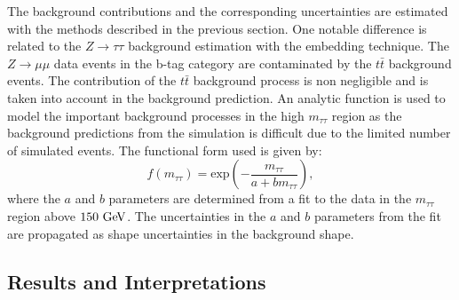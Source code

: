 The background contributions and the corresponding uncertainties are estimated with the methods described in the previous section. One notable difference is related to the $Z \rightarrow\tau\tau$ background estimation with the embedding technique. The $Z\rightarrow\mu\mu$ data events in the b-tag category are contaminated by the $t\bar{t}$ background events. The contribution of the $t\bar{t}$  background process is non negligible and is taken into account in the background prediction. An analytic function is used to model the important background  processes in the high $m_{\tau\tau}$ region as the background predictions from the simulation is difficult due to the  limited number of simulated events. The functional form used is given by:
\begin{equation} \label{eq:fc}
f(m_{\tau\tau}) = \mathrm{exp}\left( -\frac{m_{\tau\tau}}{a+bm_{\tau\tau}}\right),
\end{equation}
where the $a$ and $b$ parameters are determined from a fit to the data in the $m_{\tau\tau}$ region above $150~\mathrm{Ge\kern -0.1em V}$. The uncertainties in the $a$ and $b$ parameters from the fit are propagated as shape uncertainties in the background shape. 

\subsection{Results and Interpretations}

